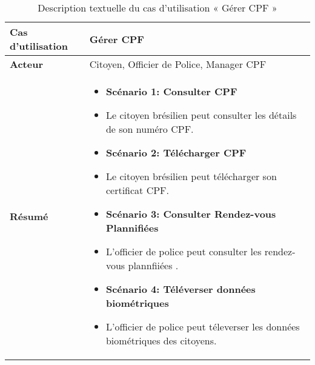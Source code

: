 \begin{longtable}{|>{\arraybackslash}p{4.2cm}|>{\arraybackslash}p{12.5cm}|}
\caption{\centering Description textuelle du cas d'utilisation « Gérer CPF »}
\label{tab:backlog} \\
\hline
\rowcolor{gray!30}
\textbf{Cas d'utilisation} & Gérer CPF \\
\hline
\endfirsthead

\hline
\endhead

\hline
\endfoot

\hline \hline
\endlastfoot
 \textbf{Acteur}  & Citoyen, Officier de Police, Manager CPF\\
\hline
\textbf{Résumé} &
\begin{itemize}[label=]
  \item\textbf{Scénario 1: Consulter CPF}
  \item Le citoyen brésilien peut consulter les détails de son numéro CPF.
  \item\textbf{Scénario 2: Télécharger CPF}
  \item Le citoyen brésilien peut télécharger son certificat CPF.
  \item\textbf{Scénario 3: Consulter Rendez-vous Plannifiées}
  \item L'officier de police peut consulter les rendez-vous plannfiiées .
  \item\textbf{Scénario 4: Téléverser données biométriques}
  \item L'officier de police peut téleverser les données biométriques des citoyens.
\end{itemize}\\
\hline






\end{longtable}
